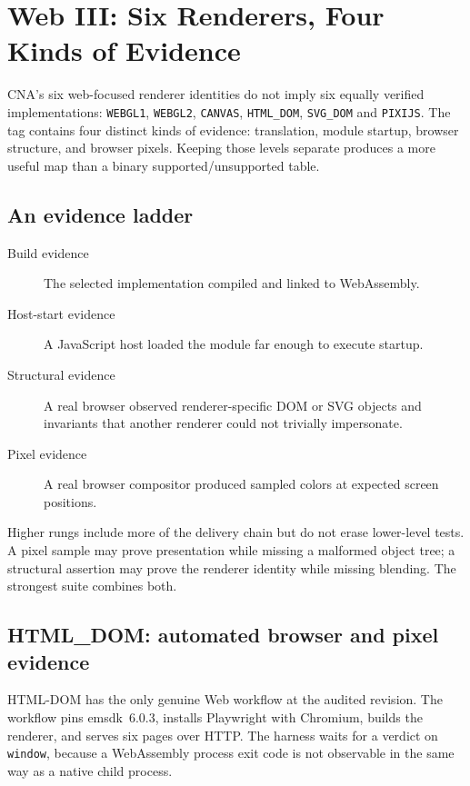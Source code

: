 \chapter{Web III: Six Renderers, Four Kinds of Evidence}
\label{ch:web-renderer-evidence}

CNA's six web-focused renderer identities do not imply six equally verified implementations:
\texttt{WEBGL1}, \texttt{WEBGL2}, \texttt{CANVAS}, \texttt{HTML\_DOM}, \texttt{SVG\_DOM} and
\texttt{PIXIJS}. The tag contains four distinct kinds of evidence: translation, module startup,
browser structure, and browser pixels. Keeping those levels separate produces a more useful map
than a binary supported/unsupported table.

\section{An evidence ladder}

\begin{description}
  \item[Build evidence] The selected implementation compiled and linked to WebAssembly.
  \item[Host-start evidence] A JavaScript host loaded the module far enough to execute startup.
  \item[Structural evidence] A real browser observed renderer-specific DOM or SVG objects and
        invariants that another renderer could not trivially impersonate.
  \item[Pixel evidence] A real browser compositor produced sampled colors at expected screen
        positions.
\end{description}

Higher rungs include more of the delivery chain but do not erase lower-level tests.  A pixel
sample may prove presentation while missing a malformed object tree; a structural assertion
may prove the renderer identity while missing blending.  The strongest suite combines both.

\section{HTML\_DOM: automated browser and pixel evidence}

HTML-DOM has the only genuine Web workflow at the audited revision.  The workflow pins
emsdk~6.0.3, installs Playwright with Chromium, builds the renderer, and serves six pages over
HTTP.  The harness waits for a verdict on \texttt{window}, because a WebAssembly process exit
code is not observable in the same way as a native child process.

